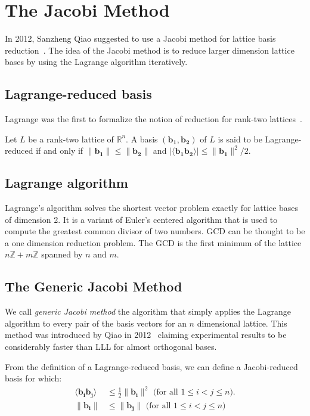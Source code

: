 \documentclass[10pt, a4paper]{article}
\renewcommand{\vec}[1]{\mathbf{#1}}
\begin{document}
\section{The Jacobi Method}

In 2012, Sanzheng Qiao suggested to use a Jacobi method for lattice basis reduction~\cite{originalJacobiMethodLatticeBasisReduction}. The idea of the Jacobi method is to reduce larger dimension lattice bases by using the Lagrange algorithm iteratively.

\subsection{Lagrange-reduced basis}

Lagrange was the first to formalize the notion of reduction for rank-two lattices~\cite{lagrangeArithmetique}.

Let $L$ be a rank-two lattice of $\mathbb{R}^n$. A basis $(\vec{b_1}, \vec{b_2})$ of $L$ is said to be Lagrange-reduced if and only if $\|\vec{b_1}\| \leq \|\vec{b_2}\|$ and $| \langle \vec{b_1} \vec{b_2} \rangle | \leq \| \vec{b_1} \|^2 / 2 $. 

\subsection{Lagrange algorithm}
\label{sec:lagrangeAlgorithm}

Lagrange's algorithm solves the shortest vector problem exactly for lattice bases of dimension 2. It is a variant of Euler's centered algorithm that is used to compute the greatest common divisor of two numbers. GCD can be thought to be a one dimension reduction problem. The GCD is the first minimum of the lattice $n \mathbb{Z} + m \mathbb{Z}$ spanned by $n$ and $m$.


\subsection{The Generic Jacobi Method}
We call \emph{generic Jacobi method} the algorithm that simply applies the Lagrange algorithm to every pair of the basis vectors for an $n$ dimensional lattice. This method was introduced by Qiao in 2012~\cite{originalJacobiMethodLatticeBasisReduction} claiming experimental results to be considerably faster than LLL for almost orthogonal bases.

From the definition of a Lagrange-reduced basis, we can define a Jacobi-reduced basis for which:
\begin{align}
\langle \vec{b_i} \vec{b_j} \rangle &\leq \frac{1}{2} \| \vec{b_i}\|^2 \text{ (for all $1 \leq i < j \leq n$)}.\\
\| \vec{b_i}\| &\leq \|\vec{b_j} \| \text{ (for all $1 \leq i < j \leq n$)}
\end{align}
\end{document}

